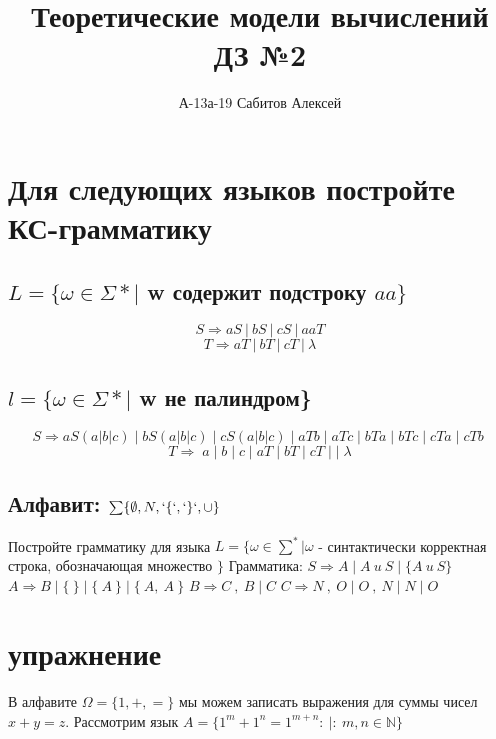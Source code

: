 \documentclass{article}
\title{Теоретические модели вычислений \\
        ДЗ №2}
\author{А-13а-19 Сабитов Алексей}
\begin{document}
\maketitle

\section{Для следующих языков постройте КС-грамматику}
\subsection{$L = \{\omega \in \Sigma* |$  w содержит подстроку $aa\}$}
 
$$ S \Rightarrow aS \:|\: bS \:|\: cS \:|\: aaT $$
$$ T \Rightarrow aT \:|\: bT \:|\: cT \:|\: \lambda$$
 
\subsection{$l = \{\omega \in \Sigma* |$  w не палиндром\}}
$$S \Rightarrow aS(a|b|c)\; | \; bS(a|b|c)\; | \;cS(a|b|c) \; | \; aTb \; | \; aTc\; | \; bTa\; | \;bTc \; | \;cTa \; | \;cTb \; $$
$$ T \Rightarrow \; a \; | \; b \; | \; c \; |\;aT \; | \; bT \; | \; cT \; | \; |\; \lambda$$
\subsection{Алфавит: $\sum \{ \emptyset, N, `\{`,`\}`, \cup \} $ }
Постройте грамматику для языка $L = \{\omega \in  \sum^*|\omega $ - синтактически корректная строка, обозначающая множество $\}$  \newline
Грамматика: \newline
$S \Rightarrow A\; | \;A\: u\: S \;|\; \{A\: u\: S\}$\newline
$A \Rightarrow  B\; |\; \{\:\} \;|\; \{\:A\:\}\; |\; \{\:A,\:A\:\}$ \newline
$B \Rightarrow  C\:,\:B \;|\;C$\newline
$C \Rightarrow  N\:,\:O\;|\;O\:,\:N\;|\;N\;|\;O$\newline

\section{упражнение}
 
    В алфавите $\Omega = \{1, +, =\}$ мы можем записать выражения для суммы чисел $x + y = z$. Рассмотрим язык $A = \{1^m + 1^n = 1^{m+n} :\ | :\ m, n \in \mathbb{N}\}$
 
\end{document}
